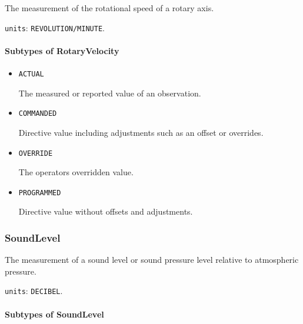 The measurement of the rotational speed of a rotary axis.


\texttt{units}: \texttt{REVOLUTION/MINUTE}.

\paragraph{Subtypes of RotaryVelocity}\mbox{}
\label{sec:Subtypes of RotaryVelocity}

\begin{itemize}

\item \texttt{ACTUAL}


The measured or reported value of an \gls{observation}.

\item \texttt{COMMANDED}


Directive value including adjustments such as an offset or overrides.

\item \texttt{OVERRIDE}


The operators overridden value.

\item \texttt{PROGRAMMED}


Directive value without offsets and adjustments.


\end{itemize}







\subsubsection{SoundLevel}
\label{sec:SoundLevel}



The measurement of a sound level or sound pressure level relative to atmospheric pressure.


\texttt{units}: \texttt{DECIBEL}.

\paragraph{Subtypes of SoundLevel}\mbox{}
\label{sec:Subtypes of SoundLevel}

